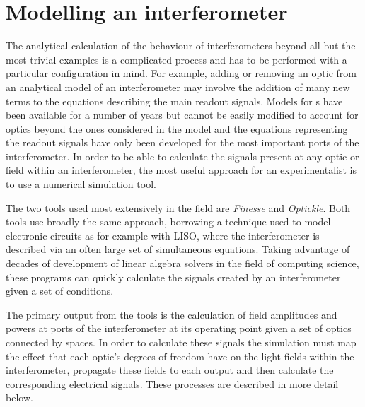 \section{Modelling an interferometer}
The analytical calculation of the behaviour of interferometers beyond all but the most trivial examples is a complicated process and has to be performed with a particular configuration in mind. For example, adding or removing an optic from an analytical model of an interferometer may involve the addition of many new terms to the equations describing the main readout signals. Models for \DRFPMI{}s have been available for a number of years \cite{Strain2003, Mueller2003, Mason2003} but cannot be easily modified to account for optics beyond the ones considered in the model and the equations representing the readout signals have only been developed for the most important ports of the interferometer. In order to be able to calculate the signals present at any optic or field within an interferometer, the most useful approach for an experimentalist is to use a numerical simulation tool.

The two tools used most extensively in the field are \emph{Finesse} and \emph{Optickle}. Both tools use broadly the same approach, borrowing a technique used to model electronic circuits as for example with \gls{LISO}, where the interferometer is described via an often large set of simultaneous equations. Taking advantage of decades of development of linear algebra solvers in the field of computing science, these programs can quickly calculate the signals created by an interferometer given a set of conditions.

The primary output from the tools is the calculation of field amplitudes and powers at ports of the interferometer at its operating point given a set of optics connected by spaces. In order to calculate these signals the simulation must map the effect that each optic's degrees of freedom have on the light fields within the interferometer, propagate these fields to each output and then calculate the corresponding electrical signals. These processes are described in more detail below. 

